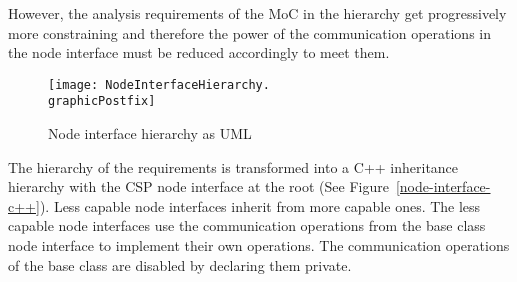 However, the analysis requirements of the MoC in the hierarchy
get progressively more constraining and therefore the power
of the communication operations in the node interface must
be reduced accordingly to meet them.

\begin{figure}
\centering
\texttt{[image: NodeInterfaceHierarchy.\\graphicPostfix]}\\
\caption{\label{node-interface-hierarchy}Node interface hierarchy as UML}
\end{figure}

The hierarchy of the requirements is transformed into a C++ inheritance
hierarchy with the CSP node interface at the root (See Figure~\ref{node-interface-c++}).
Less capable node interfaces inherit from more capable ones. The
less capable node interfaces use the communication operations from the base class node
interface to implement their own operations. The communication operations of the
base class are disabled by declaring them private.

